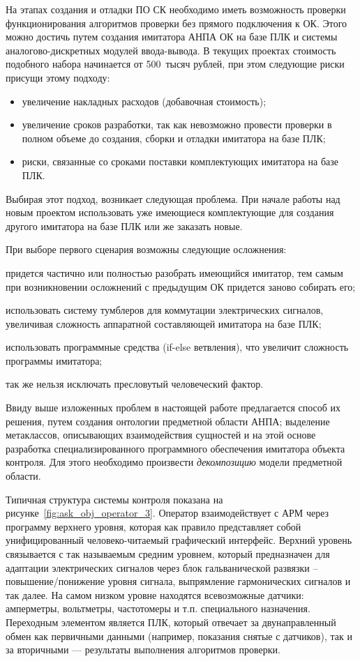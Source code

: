 На этапах создания и отладки ПО СК необходимо иметь возможность проверки
функционирования алгоритмов проверки без прямого подключения к ОК.
Этого можно достичь путем создания имитатора АНПА ОК на базе ПЛК и системы аналогово-дискретных
модулей ввода-вывода.
В текущих проектах стоимость подобного набора начинается от 500~тысяч рублей,
при этом следующие риски присущи этому подходу:
\begin{itemize}
    \item увеличение накладных расходов (добавочная стоимость);
    \item увеличение сроков разработки, так как невозможно провести проверки в полном объеме до 
        создания, сборки и отладки имитатора на базе ПЛК;
    \item риски, связанные со сроками поставки комплектующих имитатора на базе ПЛК.
\end{itemize}
Выбирая этот подход, возникает следующая проблема.
При начале работы над новым проектом использовать уже имеющиеся комплектующие для создания другого имитатора на базе ПЛК или же заказать новые.

При выборе первого сценария возможны следующие осложнения:
\begin{enumerate*}[label=\arabic*\upshape)]
    \item придется частично или полностью разобрать имеющийся имитатор, тем самым при возникновении 
        осложнений с предыдущим ОК придется заново собирать его;
    \item использовать систему тумблеров для коммутации электрических сигналов,
        увеличивая сложность аппаратной составляющей имитатора на базе ПЛК;
    \item использовать программные средства (if-else ветвления), что увеличит сложность программы имитатора;
    \item так же нельзя исключать пресловутый человеческий фактор.
\end{enumerate*}

Ввиду выше изложенных проблем в настоящей работе предлагается способ их решения,
путем создания онтологии предметной области АНПА;
выделение метаклассов, описывающих взаимодействия сущностей
и на этой основе разработка специализированного программного обеспечения
имитатора объекта контроля. Для этого необходимо произвести \textit{декомпозицию} модели предметной области.

Типичная структура системы контроля показана на рисунке~\ref{fig:ask_obj_operator_3}.
Оператор взаимодействует с АРМ через программу верхнего уровня, которая как правило представляет собой
унифицированный человеко-читаемый графический интерфейс.
Верхний уровень связывается с так называемым средним уровнем,
который предназначен для адаптации электрических сигналов через блок гальванической развязки --
повышение/понижение уровня сигнала, выпрямление гармонических сигналов и так далее.
На самом низком уровне находятся всевозможные датчики: амперметры, вольтметры, частотомеры и т.п. специального назначения.
Переходным элементом является ПЛК, который отвечает за двунаправленный обмен как первичными данными (например, показания снятые с датчиков),
так и за вторичными --- результаты выполнения алгоритмов проверки.

